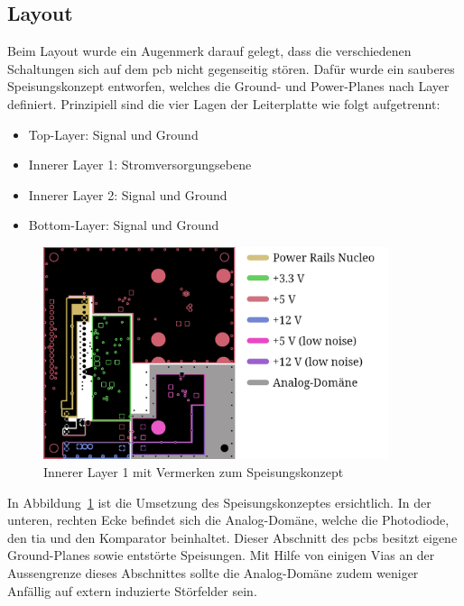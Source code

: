 \pagebreak

\subsection{Layout}\label{sec:layout}

Beim Layout wurde ein Augenmerk darauf gelegt, dass die verschiedenen Schaltungen sich auf dem \acrshort{pcb} nicht
gegenseitig stören. Dafür wurde ein sauberes Speisungskonzept entworfen, welches die Ground- und Power-Planes nach Layer
definiert. Prinzipiell sind die vier Lagen der Leiterplatte wie folgt aufgetrennt:

\begin{itemize}
    \item Top-Layer: Signal und Ground
    \item Innerer Layer 1: Stromversorgungsebene
    \item Innerer Layer 2: Signal und Ground
    \item Bottom-Layer: Signal und Ground
\end{itemize}

\begin{figure}[H]
    \centering
    \includegraphics[width=0.9\textwidth]{graphics/layout_annotated.png}
    \caption{Innerer Layer 1 mit Vermerken zum Speisungskonzept}\label{fig:layout_annotated}
\end{figure}

In Abbildung~\ref{fig:layout_annotated} ist die Umsetzung des Speisungskonzeptes ersichtlich. In der unteren, rechten Ecke
befindet sich die Analog-Domäne, welche die Photodiode, den \acrshort{tia} und den Komparator beinhaltet. Dieser Abschnitt
des \acrshort{pcb}s besitzt eigene Ground-Planes sowie entstörte Speisungen. Mit Hilfe von einigen Vias an der Aussengrenze
dieses Abschnittes sollte die Analog-Domäne zudem weniger Anfällig auf extern induzierte Störfelder sein.

